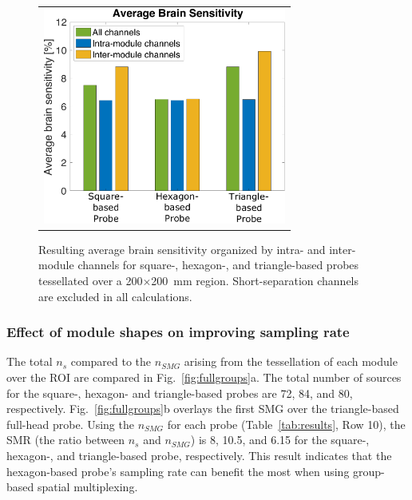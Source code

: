 \begin{figure}
    \begin{center}
    \begin{tabular}{c}
    \includegraphics[width=8cm]{fig/moca/Fig_6.pdf}
    \end{tabular}
    \end{center}
    \caption {Resulting average brain sensitivity organized by intra- and inter-module channels for square-, hexagon-, and triangle-based probes tessellated over a 200$\times$200~mm region. Short-separation channels are excluded in all calculations.} 
    \label{fig:fullbrainsensitivity}
\end{figure} 


\subsubsection{Effect of module shapes on improving sampling rate}
The total $n_s$ compared to the $n_{SMG}$ arising from the tessellation of each module over the ROI are compared in Fig.~\ref{fig:fullgroups}a. The total number of sources for the square-, hexagon- and triangle-based probes are 72, 84, and 80, respectively. Fig.~\ref{fig:fullgroups}b overlays the first SMG over the triangle-based full-head probe. Using the $n_{SMG}$ for each probe (Table~\ref{tab:results}, Row 10), the SMR (the ratio between $n_s$ and $n_{SMG}$) is 8, 10.5, and 6.15 for the square-, hexagon-, and triangle-based probe, respectively. This result indicates that the hexagon-based probe's sampling rate can benefit the most when using  group-based spatial multiplexing.

